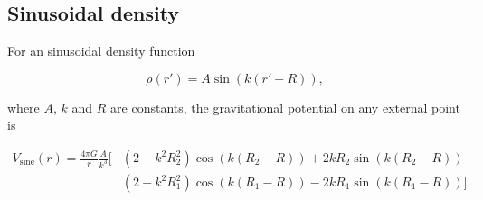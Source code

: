 \documentclass[extra, referee]{gji}
\begin{document}
\subsection{Sinusoidal density}

For an sinusoidal density function

\begin{equation}
    \rho(r') = A \sin ( k (r' - R)),
\end{equation}

\noindent
where $A$, $k$ and $R$ are constants, the gravitational potential on any external point
is

\begin{equation}
    \begin{split}
    V_\text{sine}(r) = \frac{4\pi G}{r} \frac{A}{k^3} \Big[
    & (2 - k^2 R_2^2) \cos(k(R_2 - R)) + 2 k R_2 \sin(k(R_2 - R)) - \\
    & (2 - k^2 R_1^2) \cos(k(R_1 - R)) - 2 k R_1 \sin(k(R_1 - R))
        \Big]
    \end{split}
\end{equation}
\end{document}
